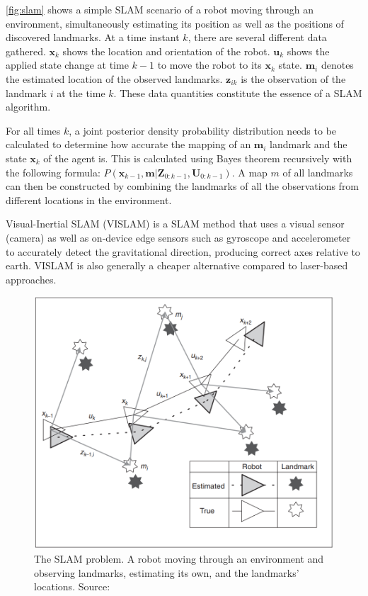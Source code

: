 \documentclass{article}
\begin{document}
\autoref{fig:slam} shows a simple SLAM scenario of a robot moving through an environment, simultaneously estimating its position as well as the positions of discovered landmarks. At a time instant $k$, there are several different data gathered. $\textbf{x}_k$ shows the location and orientation of the robot. $\textbf{u}_k$ shows the applied state change at time $k-1$ to move the robot to its $\textbf{x}_k$ state. $\textbf{m}_i$ denotes the estimated location of the observed landmarks. $\textbf{z}_{ik}$ is the observation of the landmark $i$ at the time $k$. These data quantities constitute the essence of a SLAM algorithm. \cite{background1}

For all times $k$, a joint posterior density probability distribution needs to be calculated to determine how accurate the mapping of an $\textbf{m}_i$ landmark and the state $\textbf{x}_k$ of the agent is. This is calculated using Bayes theorem recursively with the following formula: $P(\textbf{x}_{k-1}, \textbf{m} | \textbf{Z}_{0:k-1}, \textbf{U}_{0:k-1})$. A map $m$ of all landmarks can then be constructed by combining the landmarks of all the observations from different locations in the environment. \cite{background1}

Visual-Inertial SLAM (VISLAM) is a SLAM method that uses a visual sensor (camera) as well as on-device edge sensors such as gyroscope and accelerometer to accurately detect the gravitational direction, producing correct axes relative to earth. VISLAM is also generally a cheaper alternative compared to laser-based approaches. \cite{vislam}

\begin{figure}[!htb]
    \centering
    \includegraphics[width=0.6\linewidth]{slam.PNG}
    \caption{The SLAM problem. A robot moving through an environment and observing landmarks, estimating its own, and the landmarks' locations. Source: \cite{background1}}
    \label{fig:slam}
\end{figure}
\end{document}

